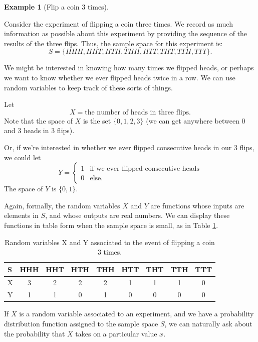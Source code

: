 \documentclass[
]{book}
\theoremstyle{definition}
\theoremstyle{definition}
\newtheorem{example}{Example}[chapter]
\theoremstyle{definition}
\theoremstyle{definition}
\theoremstyle{remark}
\begin{document}
\begin{example}[Flip a coin 3 times]
\protect\hypertarget{exm:flip-three-times}{}\label{exm:flip-three-times}

Consider the experiment of flipping a coin three times. We record as much information as possible about this experiment by providing the sequence of the results of the three flips. Thus, the sample space for this experiment is:
\[S = \{HHH,HHT,HTH,THH,HTT,THT,TTH,TTT\}.\]

We might be interested in knowing how many times we flipped heads, or perhaps we want to know whether we ever flipped heads twice in a row. We can use random variables to keep track of these sorts of things.

Let \[X = \text{the number of heads in three flips}.\] Note that the space of \(X\) is the set \(\{0, 1, 2, 3\}\) (we can get anywhere between 0 and 3 heads in 3 flips).

Or, if we're interested in whether we ever flipped consecutive heads in our 3 flips, we could let
\[Y =  \begin{cases}
    1 & \text{if we ever flipped consecutive heads} \\
    0 & \text{else.}
    \end{cases}\]
The space of \(Y\) is \(\{0,1\}\).

Again, formally, the random variables \(X\) and \(Y\) are functions whose inputs are elements in \(S\), and whose outputs are real numbers. We can display these functions in table form when the sample space is small, as in Table \ref{tab:flip-3-coins}.

\begin{table}[!h]
\centering
\caption{\label{tab:flip-3-coins}Random variables X and Y associated to the event of flipping a coin 3 times.}
\centering
\begin{tabular}[t]{>{}l||c|c|c|c|c|c|c|c}
\hline
S & HHH & HHT & HTH & THH & HTT & THT & TTH & TTT\\
\hline
X & 3 & 2 & 2 & 2 & 1 & 1 & 1 & 0\\
\hline
Y & 1 & 1 & 0 & 1 & 0 & 0 & 0 & 0\\
\hline
\end{tabular}
\end{table}

\end{example}

If \(X\) is a random variable associated to an experiment, and we have a probability distribution function assigned to the sample space \(S\), we can naturally ask about the probability that \(X\) takes on a particular value \(x\).
\end{document}
